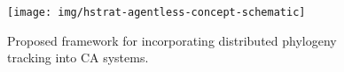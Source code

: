 \begin{figure}
\texttt{[image: img/hstrat-agentless-concept-schematic]}
\caption{Proposed framework for incorporating distributed phylogeny tracking into CA systems.}
\label{fig:hstrat-agentless-concept}
\end{figure}
